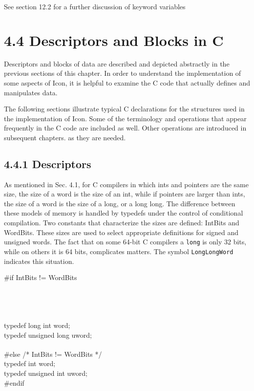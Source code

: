 See section 12.2 for a further discussion of keyword variables

\section[4.4 Descriptors and Blocks in C]{4.4 Descriptors and Blocks in C}

Descriptors and blocks of data are described and depicted abstractly
in the previous sections of this chapter. In order to understand the
implementation of some aspects of Icon, it is helpful to examine the C
code that actually defines and manipulates data.

The following sections illustrate typical C declarations for the
structures used in the implementation of Icon. Some of the terminology
and operations that appear frequently in the C code are included as
well. Other operations are introduced in subsequent chapters. as they
are needed.

\subsection[4.4.1 Descriptors]{4.4.1 Descriptors}

As mentioned in Sec. 4.1, for C compilers in which ints and pointers
are the same size, the size of a word is the size of an int, while if
pointers are larger than ints, the size of a word is the size of a
long, or a long long. The difference between these models of memory is
handled by typedefs under the control of conditional compilation. Two
constants that characterize the sizes are defined: IntBits and
WordBits. These sizes are used to select appropriate definitions for
signed and unsigned words. The fact that on some 64-bit C compilers a
\texttt{long} is only 32 bits, while on others it is 64 bits,
complicates matters. The symbol \texttt{LongLongWord} indicates this
situation.

\bigskip

\begin{iconcode}
\>\#if IntBits != WordBits\\
\>\\
\>\>\\
\>\>\\
\>\\
\>\>\>typedef long int word;\\
\>\>\>typedef unsigned long uword;\\
\>\\
\>\#else \>\>\>\>\>\>\> /* IntBits != WordBits */ \\
\>typedef int word;\\
\>typedef unsigned int uword;\\
\>\#endif
\end{iconcode}

